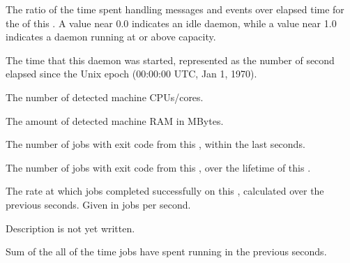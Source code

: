 \begin{description}

\item[\AdAttr{DaemonCoreDutyCycle}:] The ratio of the time spent handling 
messages and events over elapsed time for the  of this .
  A value near 0.0 indicates an idle daemon, while a value near 1.0 indicates a daemon running at or above capacity.

\item[\AdAttr{DaemonStartTime}:] The time that this daemon was
  started, represented as the number of second elapsed since
    the Unix epoch (00:00:00 UTC, Jan 1, 1970).

\item[\AdAttr{DetectedCpus}:] The number of detected machine CPUs/cores.

\item[\AdAttr{DetectedMemory}:] The amount of detected machine RAM in MBytes.

\item[\AdAttr{ExitCode<N>}:] The number of jobs with exit code
   from this ,
   within the last  seconds.

\item[\AdAttr{ExitCodeCumulative<N>}:] The number of jobs with exit 
  code  from this , over the lifetime of this
  .

\item[\AdAttr{JobCompletionRate}:] The rate at which jobs completed
  successfully on this , 
  calculated over the previous  seconds.
  Given in jobs per second.

\item[\AdAttr{JobQueueBirthdate}:] Description is not yet written.

\item[\AdAttr{JobsAccumRunningTime}:] Sum of the all of the time jobs have spent running
  in the previous  seconds.


\end{description}
